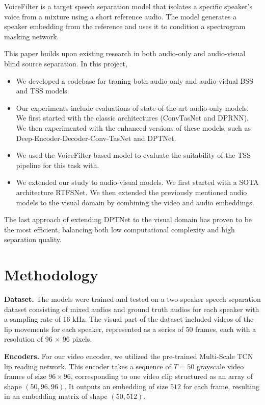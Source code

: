 \documentclass[10pt,conference,compsocconf]{IEEEtran}
\begin{document}
VoiceFilter\cite{wang2019voicefilter} is a target speech separation model that isolates a specific speaker’s voice from a mixture using a short reference audio. The model generates a speaker embedding from the reference and uses it to condition a spectrogram masking network.

This paper builds upon existing research in both audio-only and audio-visual blind source separation. In this project, 

\begin{itemize}
	\item We developed a codebase for traning both audio-only and audio-vidual BSS and TSS models. 
	\item Our experiments include evaluations of state-of-the-art audio-only models. We first started with the classic architectures (ConvTasNet and DPRNN). We then experimented with the enhanced versions of these models, such as Deep-Encoder-Decoder-Conv-TasNet and DPTNet. 
	\item We used the VoiceFilter-based model to evaluate the suitability of the TSS pipeline for this task with. 
	\item We extended our study to audio-visual models. We first started with a SOTA architecture RTFSNet. We then extended the previously mentioned audio models to the visual domain by combining the video and audio embeddings. 
\end{itemize}

The last approach of extending DPTNet to the visual domain has proven to be the most efficient, balancing both low computational complexity and high separation quality.

\section{Methodology}\label{sec:methodology}
\textbf{Dataset.} The models were trained and tested on a two-speaker speech separation dataset consisting of mixed audios and ground truth audios for each speaker with a sampling rate of 16 kHz. The visual part of the dataset included videos of the lip movements for each speaker, represented as a series of 50 frames, each with a resolution of 96 × 96 pixels.

\textbf{Encoders.} For our video encoder, we utilized the pre-trained Multi-Scale TCN lip reading network\cite{martinez2020lipreading}. This encoder takes a sequence of $T = 50$ grayscale video frames of size \( 96 \times 96 \), corresponding to one video clip structured as an array of shape \( (50, 96, 96) \). It outputs an embedding of size \( 512 \) for each frame, resulting in an embedding matrix of shape \( (50, 512) \).
\end{document}
